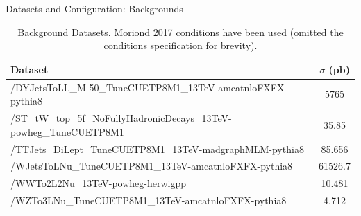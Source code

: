 \documentclass[pdf, 9pt]{beamer}
\begin{document}
  \begin{frame}{Datasets and Configuration: Backgrounds}
    \begin{table}[htb]
    \caption{Background Datasets. Moriond 2017 conditions have been used (omitted the conditions specification for brevity).}
    \label{table:higgs_data_backgrounddatasets}
    \begin{center}
        \begin{tabular}{ l  c}
            \hline
            Dataset & $\sigma$ (pb)\\
            \hline
            \small{/DYJetsToLL\_M-50\_TuneCUETP8M1\_13TeV-amcatnloFXFX-pythia8} & 5765\\
            \small{/ST\_tW\_top\_5f\_NoFullyHadronicDecays\_13TeV-powheg\_TuneCUETP8M1} & 35.85\\
            \small{/TTJets\_DiLept\_TuneCUETP8M1\_13TeV-madgraphMLM-pythia8} & 85.656\\
            \small{/WJetsToLNu\_TuneCUETP8M1\_13TeV-amcatnloFXFX-pythia8} & 61526.7\\
            \small{/WWTo2L2Nu\_13TeV-powheg-herwigpp} & 10.481\\
            \small{/WZTo3LNu\_TuneCUETP8M1\_13TeV-amcatnloFXFX-pythia8} & 4.712\\
            \hline
        \end{tabular}
    \end{center}
    \end{table}
  \end{frame}
\end{document}
